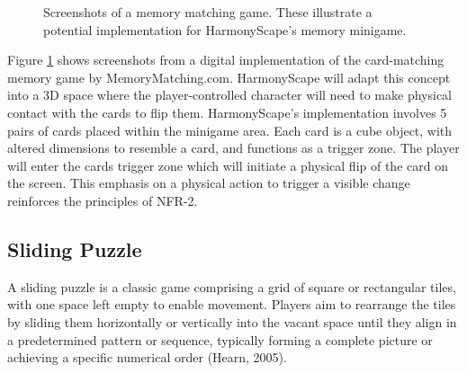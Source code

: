 \documentclass{l4proj}
\begin{document}
\begin{figure}[h]
  \caption{Screenshots of a memory matching game. These illustrate a potential implementation for HarmonyScape's memory minigame.} 
  \label{fig:mem_match}
\end{figure}

Figure \ref{fig:mem_match} shows screenshots from a digital implementation of the card-matching memory game by MemoryMatching.com. HarmonyScape will adapt this concept into a 3D space where the player-controlled character will need to make physical contact with the cards to flip them. HarmonyScape's implementation involves 5 pairs of cards placed within the minigame area. Each card is a cube object, with altered dimensions to resemble a card, and functions as a trigger zone. The player will enter the cards trigger zone which will initiate a physical flip of the card on the screen. This emphasis on a physical action to trigger a visible change reinforces the principles of NFR-2.

\subsection{Sliding Puzzle}
A sliding puzzle is a classic game comprising a grid of square or rectangular tiles, with one space left empty to enable movement. Players aim to rearrange the tiles by sliding them horizontally or vertically into the vacant space until they align in a predetermined pattern or sequence, typically forming a complete picture or achieving a specific numerical order (Hearn, 2005).
\end{document}
